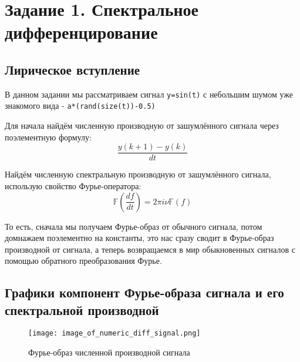 \chapter{Задание 1. Спектральное дифференцирование}
\label{ch:chap1}



\lstset{style=mystyle}

\section{Лирическое вступление}

В данном задании мы рассматриваем сигнал \texttt{y=sin(t)} с небольшим шумом уже знакомого вида - \texttt{a*(rand(size(t))-0.5)}

Для начала найдём численную производную от зашумлённого сигнала через поэлементную формулу: $$\frac{y(k+1) - y(k)}{dt}$$

Найдём численную спектральную производную от зашумлённого сигнала, использую свойство Фурье-оператора: $$\mathbb{F}(\frac{df}{dt}) = 2\pi i \nu\mathbb{F}(f)$$

То есть, сначала мы получаем Фурье-образ от обычного сигнала, потом домнажаем поэлементно на константы, это нас сразу сводит в Фурье-образ производной от сигнала, а теперь возвращаемся в мир обыкновенных сигналов с помощью обратного преобразования Фурье.

\newpage
\section{Графики компонент Фурье-образа сигнала и его спектральной производной}

\begin{figure}[ht]
    \centering
    \texttt{[image: image\_of\_numeric\_diff\_signal.png]}
	\caption{Фурье-образ численной производной сигнала}
\end{figure}


